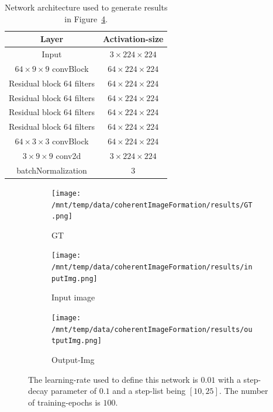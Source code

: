 \documentclass[a4paper, 11pt]{article}
\begin{document}
\begin{table}
\begin{center}
    \begin{tabular}{ | c | c |}
    \hline
    Layer & Activation-size  \\ \hline
    Input & $3\times 224 \times 224$  \\ \hline
    $64 \times 9\times 9$ convBlock & $64 \times 224 \times 224$  \\ \hline
    Residual block $64$ filters& $64 \times 224 \times 224$  \\ \hline
    Residual block $64$ filters& $64 \times 224 \times 224$  \\ \hline
    Residual block $64$ filters& $64 \times 224 \times 224$  \\ \hline
    Residual block $64$ filters& $64 \times 224 \times 224$  \\ \hline
    $64 \times 3 \times 3$ convBlock & $64 \times 224 \times 224$  \\ \hline
    $3 \times 9\times 9$ conv2d & $3 \times 224 \times 224$  \\ \hline
    batchNormalization & $3$  \\ \hline
    \end{tabular}
\end{center}
\caption{Network architecture used to generate results in Figure~\ref{fig:outputFig}.}
\label{networkArch}
\end{table}
\begin{figure}[!h]
\centering
\begin{subfigure}[b]{0.22\textwidth}
        \texttt{[image: /mnt/temp/data/coherentImageFormation/results/GT.png]}
        \caption{GT}
        \label{fig:GT}
    \end{subfigure}
    \begin{subfigure}[b]{0.22\textwidth}
        \texttt{[image: /mnt/temp/data/coherentImageFormation/results/inputImg.png]}
        \caption{Input image}
        \label{fig:inputImg}
    \end{subfigure}
    \begin{subfigure}[b]{0.22\textwidth}
        \texttt{[image: /mnt/temp/data/coherentImageFormation/results/outputImg.png]}
        \caption{Output-Img}
        \label{fig:outputImg}
    \end{subfigure}
\caption{The learning-rate used to define this network is $0.01$ with a step-decay parameter of $0.1$ and a step-list being $[10, 25]$. The number of training-epochs is $100$.}
\label{fig:outputFig}
\end{figure}
\end{document}
